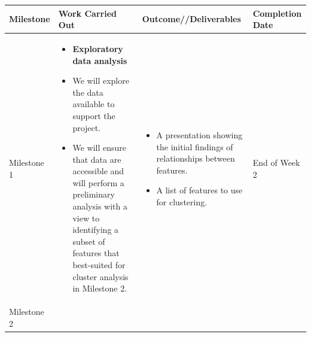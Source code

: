 \documentclass[
]{book}
\providecommand{\tightlist}{%
  \setlength{\itemsep}{0pt}\setlength{\parskip}{0pt}}
\begin{document}
\begin{longtable}[]{@{}llll@{}}
\toprule
\begin{minipage}[b]{0.14\columnwidth}\raggedright
Milestone\strut
\end{minipage} & \begin{minipage}[b]{0.30\columnwidth}\raggedright
Work Carried Out\strut
\end{minipage} & \begin{minipage}[b]{0.30\columnwidth}\raggedright
Outcome//Deliverables\strut
\end{minipage} & \begin{minipage}[b]{0.15\columnwidth}\raggedright
Completion
Date\strut
\end{minipage}\tabularnewline
\midrule
\endhead
\begin{minipage}[t]{0.14\columnwidth}\raggedright
Milestone
1\strut
\end{minipage} & \begin{minipage}[t]{0.30\columnwidth}\raggedright
\begin{itemize}
\tightlist
\item
  \textbf{Exploratory data
  analysis}
\item
  We will explore the
  data available to
  support the project.
\item
  We will ensure that
  data are accessible
  and will perform a
  preliminary analysis
  with a view to
  identifying a subset
  of features that
  best-suited for
  cluster analysis in
  Milestone 2.
\end{itemize}\strut
\end{minipage} & \begin{minipage}[t]{0.30\columnwidth}\raggedright
\begin{itemize}
\tightlist
\item
  A presentation
  showing the initial
  findings of
  relationships between
  features.
\item
  A list of features
  to use for clustering.
\end{itemize}\strut
\end{minipage} & \begin{minipage}[t]{0.15\columnwidth}\raggedright
End
of
Week
2\strut
\end{minipage}\tabularnewline
\begin{minipage}[t]{0.14\columnwidth}\raggedright
Milestone
2\strut
\end{minipage} & \begin{minipage}[t]{0.30\columnwidth}\raggedright

\end{minipage}
\end{longtable}
\end{document}
